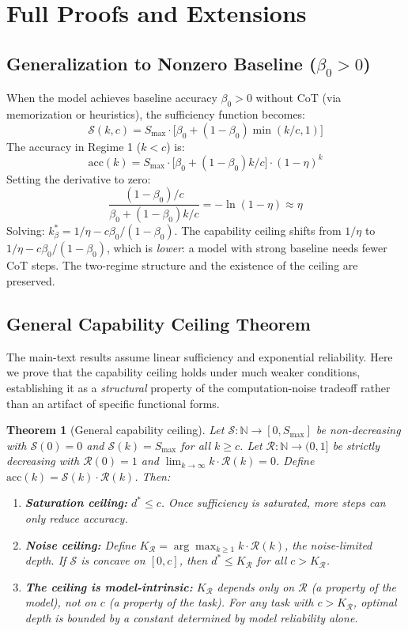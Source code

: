 \documentclass{article}
\newtheorem{theorem}{Theorem}
\theoremstyle{definition}
\theoremstyle{remark}
\newcommand{\depth}{d^*}       %
\newcommand{\noise}{\eta}      %
\newcommand{\acc}{\mathrm{acc}} %
\newcommand{\suf}{\mathcal{S}} %
\newcommand{\rel}{\mathcal{R}} %
\newcommand{\Smax}{S_{\max}}   %
\newcommand{\N}{\mathbb{N}}
\begin{document}
\appendix

\section{Full Proofs and Extensions}
\label{app:proofs}

\subsection{Generalization to Nonzero Baseline ($\beta_0 > 0$)}
\label{app:baseline}

When the model achieves baseline accuracy $\beta_0 > 0$ without CoT (via memorization or heuristics), the sufficiency function becomes:
\[
\suf(k, c) = \Smax \cdot \bigl[\beta_0 + (1 - \beta_0)\min(k/c, 1)\bigr]
\]
The accuracy in Regime 1 ($k < c$) is:
\[
\acc(k) = \Smax \cdot \bigl[\beta_0 + (1-\beta_0)k/c\bigr] \cdot (1-\noise)^k
\]
Setting the derivative to zero:
\[
\frac{(1-\beta_0)/c}{\beta_0 + (1-\beta_0)k/c} = -\ln(1-\noise) \approx \noise
\]
Solving: $k^*_{\beta} = 1/\noise - c\beta_0/(1-\beta_0)$. The capability ceiling shifts from $1/\noise$ to $1/\noise - c\beta_0/(1-\beta_0)$, which is \emph{lower}: a model with strong baseline needs fewer CoT steps. The two-regime structure and the existence of the ceiling are preserved.

\subsection{General Capability Ceiling Theorem}
\label{app:robustness}

The main-text results assume linear sufficiency and exponential reliability. Here we prove that the capability ceiling holds under much weaker conditions, establishing it as a \emph{structural} property of the computation-noise tradeoff rather than an artifact of specific functional forms.

\begin{theorem}[General capability ceiling]
\label{thm:general-ceiling}
Let $\suf : \N \to [0, \Smax]$ be non-decreasing with $\suf(0) = 0$ and $\suf(k) = \Smax$ for all $k \geq c$. Let $\rel : \N \to (0, 1]$ be strictly decreasing with $\rel(0) = 1$ and $\lim_{k \to \infty} k \cdot \rel(k) = 0$. Define $\acc(k) = \suf(k) \cdot \rel(k)$. Then:
\begin{enumerate}
\item[\emph{(i)}] \textbf{Saturation ceiling:} $\depth \leq c$. Once sufficiency is saturated, more steps can only reduce accuracy.
\item[\emph{(ii)}] \textbf{Noise ceiling:} Define $K_\rel = \arg\max_{k \geq 1} k \cdot \rel(k)$, the noise-limited depth. If $\suf$ is concave on $[0, c]$, then $\depth \leq K_\rel$ for all $c > K_\rel$.
\item[\emph{(iii)}] \textbf{The ceiling is model-intrinsic:} $K_\rel$ depends only on $\rel$ (a property of the model), not on $c$ (a property of the task). For any task with $c > K_\rel$, optimal depth is bounded by a constant determined by model reliability alone.
\end{enumerate}
\end{theorem}
\end{document}
